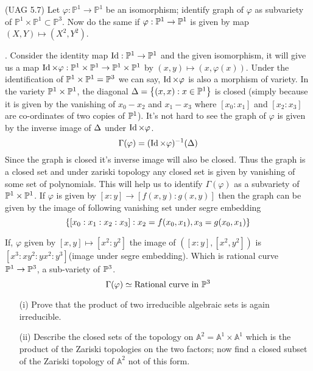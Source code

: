 \documentclass[12pt]{article}
\begin{document}
\begin{prob} %
    (UAG 5.7) Let $\varphi : \mathbb{P}^1 \to \mathbb{P}^1$ be an isomorphism; identify graph of $\varphi$ as subvariety of $\mathbb{P}^1 \times \mathbb{P}^1\subset \mathbb{P}^3$. Now do the same if $\varphi : \mathbb{P}^1 \to \mathbb{P}^1$ is given by map $(X,Y)\mapsto (X^2,Y^2)$.
\end{prob}

\sol. Consider the identity map $\operatorname{Id} : \mathbb{P}^1 \to \mathbb{P}^1$ and the given isomorphism, it will give us a map $\operatorname{Id} \times \varphi :\mathbb{P}^1 \times \mathbb{P}^1 \to \mathbb{P}^1\times \mathbb{P}^1$ by $(x,y)\mapsto (x,\varphi(x))$. Under the identification of $\mathbb{P}^1 \times \mathbb{P}^1 = \mathbb{P}^3$ we can say, $\operatorname{Id} \times \varphi$ is also a morphism of variety. In the variety $\mathbb{P}^1 \times \mathbb{P}^1$, the diagonal $\Delta = \qty{(x,x): x \in \mathbb{P}^1}$ is closed (simply because it is given by the vanishing of $x_0-x_2$ and $x_1-x_3$ where $[x_0:x_1]$ and $[x_2:x_3]$ are co-ordinates of two copies of $\mathbb{P}^1$). It's not hard to see the graph of $\varphi$ is given by the inverse image of $\Delta$ under $\operatorname{Id} \times \varphi$. $$\Gamma(\varphi)= (\operatorname{Id} \times \varphi)^{- 1}(\Delta)$$ Since the graph is closed it's inverse image will also be closed. Thus the graph is a closed set and under zariski topology any closed set is given by vanishing of some set of polynomials. This will help us to identify $\Gamma(\varphi)$ as a subvariety of $\mathbb{P}^1\times \mathbb{P}^1$. If $\varphi$ is given by $[x:y]\to [f(x,y):g(x,y)]$ then the graph can be given by the image of following vanishing set under segre embedding $$\qty{[x_0:x_1:x_2:x_3]: x_2 =f(x_0,x_1), x_3=g(x_0,x_1)}$$

\vspace*{0.2cm}

\noindent If, $\varphi$ given by $[x,y]\mapsto [x^2:y^2]$ the image of $([x:y],[x^2,y^2])$ is $[x^3:xy^2:yx^2:y^3]$(image under segre embedding). Which is rational curve $\mathbb{P}^1 \to \mathbb{P}^3$, a sub-variety of $\mathbb{P}^3$.
$$\Gamma(\varphi)\simeq \text{Rational curve in }\mathbb{P}^3$$


\begin{prob}
    \begin{enumerate}
        \item[(i)] Prove that the product of two irreducible algebraic sets is again irreducible. 
        \item[(ii)] Describe the closed sets of the topology on $\mathbb{A}^2 = \mathbb{A}^1 \times \mathbb{A}^1$ which is the product of the Zariski topologies on the two factors; now find a closed subset of the Zariski topology of $\mathbb{A}^2$ not of this form. 
    \end{enumerate}
    \end{prob}
    
\end{document}
